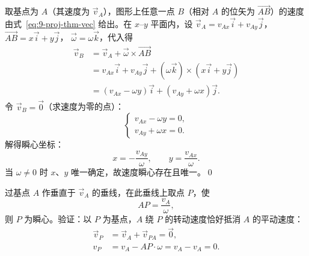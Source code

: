 取基点为 $A$（其速度为 $\vec{v}_A$），图形上任意一点 $B$（相对 $A$ 的位矢为 $\vec{AB}$）的速度由式~\eqref{eq:9-proj-thm-vec} 给出。在 $x$--$y$ 平面内，设
$\vec{v}_A=v_{Ax}\vec{i}+v_{Ay}\vec{j}$，
$\vec{AB}=x\vec{i}+y\vec{j}$，
$\vec{\omega}=\omega\vec{k}$，代入得
\begin{equation}\label{eq:9-ic-comp}
  \begin{aligned}
    \vec{v}_B &= \vec{v}_A+\vec{\omega}\times\vec{AB}\\
      &= v_{Ax}\vec{i}+v_{Ay}\vec{j}+(\omega\vec{k})\times(x\vec{i}+y\vec{j})\\
      &= \left(v_{Ax}-\omega y\right)\vec{i}+\left(v_{Ay}+\omega x\right)\vec{j}.
  \end{aligned}
\end{equation}
令 $\vec{v}_B=\vec{0}$（求速度为零的点）：
\begin{equation}\label{eq:9-ic-zero}
  \begin{cases}
    v_{Ax}-\omega y = 0,\\
    v_{Ay}+\omega x = 0.
  \end{cases}
\end{equation}
解得瞬心坐标：
\begin{equation}\label{eq:9-ic-sol}
  x=-\frac{v_{Ay}}{\omega},
  \qquad
  y=\frac{v_{Ax}}{\omega}.
\end{equation}
当 $\omega\neq 0$ 时 $x$、$y$ 唯一确定，故速度瞬心存在且唯一。\qed


过基点 $A$ 作垂直于 $\vec{v}_A$ 的垂线，在此垂线上取点 $P$，使
\begin{equation}\label{eq:9-ic-geo-ap}
  AP=\frac{v_A}{\omega},
\end{equation}
则 $P$ 为瞬心。验证：以 $P$ 为基点，$A$ 绕 $P$ 的转动速度恰好抵消 $A$ 的平动速度：
\begin{equation}\label{eq:9-ic-geo-verify}
  \begin{aligned}
    \vec{v}_P &= \vec{v}_A+\vec{v}_{PA}=\vec{0},\\
    v_P &= v_A-AP\cdot\omega = v_A-v_A = 0.
  \end{aligned}
\end{equation}

\begin{center}
\end{center}

